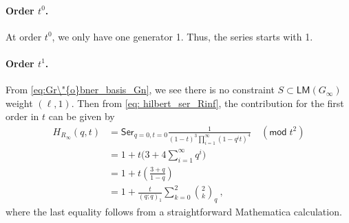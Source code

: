\documentclass[a4paper,10pt]{article}
\newcommand{\mr}[1]{\mathsf{#1}}
\begin{document}
\paragraph{Order $t^0$.} At order $t^0$, we only have one generator 1. Thus, the series starts with 1. 
\paragraph{Order $t^1$.} From \eqref{eq:Gr\"{o}bner_basis_Gn}, we see there is no constraint $S\subset\mr{LM}(G_\infty)$  weight $(\ell,1)$. Then from \eqref{eq: hilbert_ser_Rinf}, the contribution for the first order in $t$ can be given by
\begin{equation}\label{eq:t1_comp_D3}
    \begin{aligned}
H_{R_\infty}(q,t) &= \mr{Ser}_{q=0,t=0}\frac{1}{(1-t)^3 \prod_{i=1}^{\infty}\left(1-q^i t\right)^4}\quad (\mr{mod} \;t^2)\\
& = 1 + t\bigg(3+4\sum_{i=1}^\infty q^i\bigg)\\
& = 1+t\left(\frac{3+q}{1-q}\right) \\
& = 1+\frac{t}{(q ; q)_1} \sum_{k=0}^2\binom{2}{k}_q~,
\end{aligned}
\end{equation}
where the last equality follows from a straightforward Mathematica calculation. 
\end{document}
